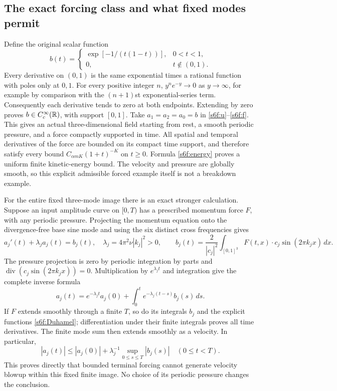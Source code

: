 \subsection{The exact forcing class and what fixed modes permit}
\label{s6f:classification}
Define the original scalar function
\[
 b(t)=\begin{cases}\exp[-1/(t(1-t))],&0<t<1,\\0,&t\notin(0,1).
       \end{cases}
\]
Every derivative on $(0,1)$ is the same exponential times a rational
function with poles only at $0,1$. For every positive integer $n$,
$y^n e^{-y}\to0$ as $y\to\infty$, for example by comparison with
the $(n+1)$st exponential-series term. Consequently each derivative
tends to zero at both endpoints. Extending by zero proves
$b\in C_c^\infty(\mathbb R)$, with support $[0,1]$.
Take $a_1=a_2=a_0=b$ in \eqref{s6f:u}--\eqref{s6f:f}. This gives
an actual three-dimensional field starting from rest, a smooth periodic
pressure, and a force compactly supported in time. All spatial and
temporal derivatives of the force are bounded on its compact time
support, and therefore satisfy every bound
$C_{\alpha mK}(1+t)^{-K}$ on $t\geq0$. Formula
\eqref{s6f:energy} proves a uniform finite kinetic-energy bound.
The velocity and pressure are globally smooth, so this explicit
admissible forced example itself is not a breakdown example.

For the entire fixed three-mode image there is an exact stronger
calculation. Suppose an input amplitude curve on $[0,T)$ has a
prescribed momentum force $F$, with any periodic pressure. Projecting
the momentum equation onto the divergence-free base sine mode and
using the six distinct cross frequencies gives
\begin{equation}
 a_j'(t)+\lambda_ja_j(t)=b_j(t),\quad
 \lambda_j=4\pi^2\nu|k_j|^2>0,\qquad
 b_j(t)=\frac2{|c_j|^2}\int_{[0,1]^3}
           F(t,x)\cdot c_j\sin(2\pi k_jx)\,dx.
 \label{s6f:baseODE}
\end{equation}
The pressure projection is zero by periodic integration by parts and
$\operatorname{div}(c_j\sin(2\pi k_jx))=0$. Multiplication by
$e^{\lambda_jt}$ and integration give the complete inverse formula
\begin{equation}
 a_j(t)=e^{-\lambda_jt}a_j(0)
              +\int_0^te^{-\lambda_j(t-s)}b_j(s)\,ds.
 \label{s6f:Duhamel}
\end{equation}
If $F$ extends smoothly through a finite $T$, so do its integrals
$b_j$ and the explicit functions \eqref{s6f:Duhamel}; differentiation
under their finite integrals proves all time derivatives. The finite
mode sum then extends smoothly as a velocity. In particular,
\[
 |a_j(t)|\leq |a_j(0)|+
     \lambda_j^{-1}\sup_{0\leq s\leq T}|b_j(s)|\quad(0\leq t<T).
\]
This proves directly that bounded terminal forcing cannot generate
velocity blowup within this fixed finite image. No choice of its
periodic pressure changes the conclusion.

